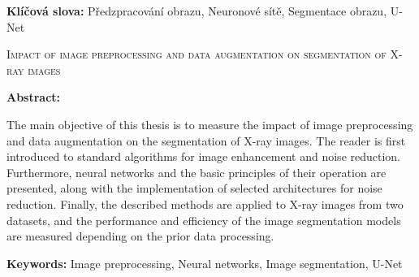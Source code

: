 \documentclass[male,czech,api_ing]{thesis}
\newcommand{\nazeven}{Impact of image preprocessing and data augmentation on segmentation of X-ray images}     %
\begin{document}
\textbf{Klíčová slova:} Předzpracování obrazu, Neuronové sítě, Segmentace obrazu, U-Net

\bigskip


\textsc{\nazeven}

\textbf{Abstract:}

The main objective of this thesis is to measure the impact of image preprocessing and data augmentation on the segmentation of X-ray images. The reader is first introduced to standard algorithms for image enhancement and noise reduction. Furthermore, neural networks and the basic principles of their operation are presented, along with the implementation of selected architectures for noise reduction. Finally, the described methods are applied to X-ray images from two datasets, and the performance and efficiency of the image segmentation models are measured depending on the prior data processing.

\textbf{Keywords:} Image preprocessing, Neural networks, Image segmentation, U-Net

\tableofcontents

	     
\end{document}
